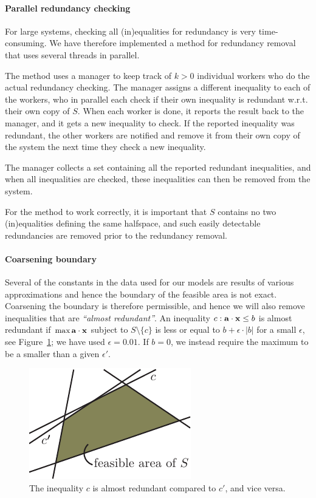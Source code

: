 \paragraph{Parallel redundancy checking}
For large systems, checking all (in)equalities for redundancy is very time-consuming. We have therefore implemented a method for redundancy removal that uses several threads in parallel. 

The method uses a manager to keep track of $k>0$ individual workers who do the actual redundancy checking.
The manager assigns a different inequality to each of the workers, who in parallel each check if their own inequality is redundant w.r.t. their own copy of $S$. When each worker is done, it reports the result back to the manager, and it gets a new inequality to check.  
If the reported inequality was redundant, the other workers are notified and remove it from their own copy of the system the next time they check a new inequality. 

The manager collects a set containing all the reported redundant inequalities, and when all inequalities are checked, these inequalities can then be removed from the system.

For the method to work correctly, it is important that $S$ contains no two (in)equalities defining the same halfspace, and such easily detectable redundancies are removed prior to the redundancy removal.

\paragraph{Coarsening boundary} 
Several of the constants in the data used for our models are results of various approximations and hence the boundary of the feasible area is not exact. Coarsening the boundary is therefore permissible, and hence we will also remove inequalities that are \emph{``almost redundant''}. An inequality $c: \mathbf{a}\cdot\mathbf{x}\leq b$ is almost redundant if $\max \mathbf{a}\cdot\mathbf{x}$  subject to $S\setminus\{c\}$ is less or equal to $b + \epsilon\cdot |b|$ for a small $\epsilon$, see Figure~\ref{fig:almostRedundant}; we have used $\epsilon = 0.01$. If $b=0$, we instead require the maximum to be a smaller than a given $\epsilon'$. 

\begin{figure}
	\centering
		\includegraphics[scale=0.9]{figures/almostRedundant.pdf}
	\caption{The inequality $c$ is almost redundant compared to $c'$, and vice versa.}
	\label{fig:almostRedundant}
\end{figure}


